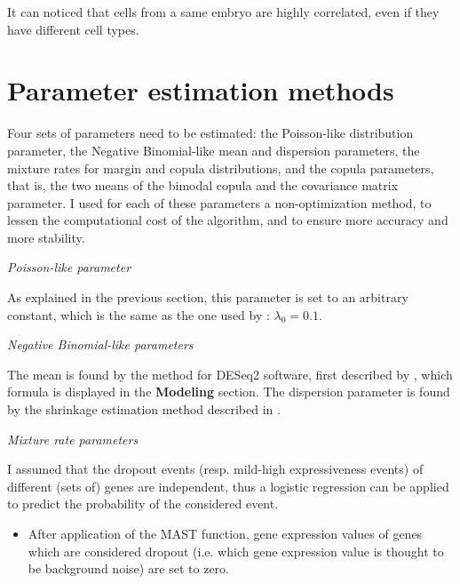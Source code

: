 \documentclass{report}
\begin{document}
{%

It can noticed that cells from a same embryo are highly correlated, even if they have different cell types.

\section*{Parameter estimation methods}

Four sets of parameters need to be estimated: the Poisson-like distribution parameter, the Negative Binomial-like mean and dispersion parameters, the mixture rates for margin and copula distributions, and the copula parameters, that is, the two means of the bimodal copula and the covariance matrix parameter. I used for each of these parameters a non-optimization method, to lessen the computational cost of the algorithm, and to ensure more accuracy and more stability.

\bigskip
\noindent \textit{Poisson-like parameter}
\bigskip

As explained in the previous section, this parameter is set to an arbitrary constant, which is the same as the one used by \cite{kharchenko2014bayesian}: $\lambda_0 = 0.1$.

\bigskip
\noindent \textit{Negative Binomial-like parameters}
\bigskip

The mean is found by the method for DESeq2 software, first described by \cite{anders2010differential}, which formula is displayed in the \textbf{Modeling} section. The dispersion parameter is found by the shrinkage estimation method described in \cite{yu2013shrinkage}.

\bigskip
\noindent \textit{Mixture rate parameters}
\bigskip

I assumed that the dropout events (resp. mild-high expressiveness events) of different (sets of) genes are independent, thus a logistic regression can be applied to predict the probability of the considered event\cite{andersonLogistic}\cite{petersLecture}\cite{frostWhy}.\\


\begin{itemize}
\item After application of the MAST function, gene expression values of genes which are considered dropout (i.e. which gene expression value is thought to be background noise) are set to zero.\\


\end{itemize}}
\end{document}
